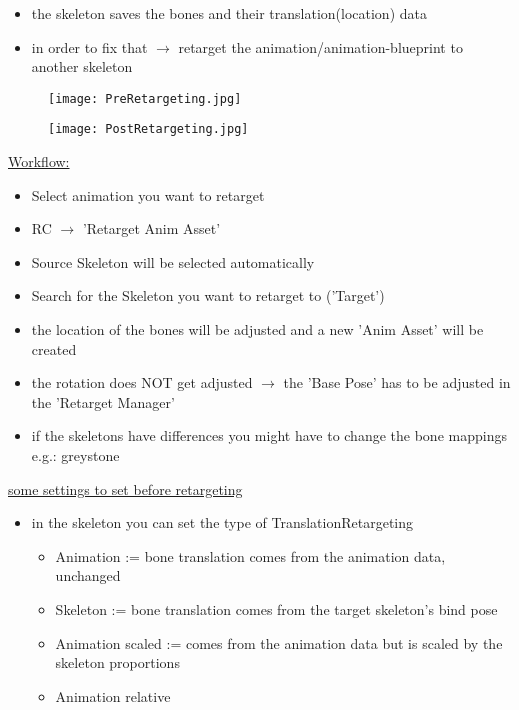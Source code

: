         \begin{itemize}
            \item the skeleton saves the bones and their translation(location) data
            \item in order to fix that $\rightarrow$ retarget the animation/animation-blueprint to another skeleton
        \end{itemize}
        \begin{figure}
            \texttt{[image: PreRetargeting.jpg]}
            \caption{}
        \end{figure}
        \begin{figure}
            \texttt{[image: PostRetargeting.jpg]}
            \caption{}
        \end{figure}
        \uline{Workflow:}
        \begin{itemize}
            \item Select animation you want to retarget
            \item RC $\rightarrow$ 'Retarget Anim Asset'
            \item Source Skeleton will be selected automatically
            \item Search for the Skeleton you want to retarget to ('Target')
            \item the location of the bones will be adjusted and a new 'Anim Asset' will be created
            \item the rotation does NOT get adjusted $\rightarrow$ the 'Base Pose' has to be adjusted in the 'Retarget Manager'
            \item if the skeletons have differences you might have to change the bone mappings e.g.: greystone
        \end{itemize}
        \uline{some settings to set before retargeting}
        \begin{itemize}
            \item in the skeleton you can set the type of \glqq TranslationRetargeting\grqq
            \begin{itemize}
                \item Animation := bone translation comes from the animation data, unchanged
                \item Skeleton := bone translation comes from the target skeleton's bind pose
                \item Animation scaled := comes from the animation data but is scaled by the skeleton proportions
                \item Animation relative
            \end{itemize}
        \end{itemize}

